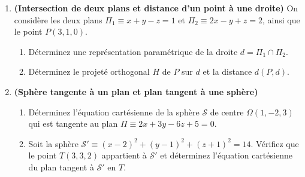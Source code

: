 \begin{enumerate}[label=\textbf{Exercice 7.\arabic* --}, align=left, leftmargin=*]
    \item \textbf{(Intersection de deux plans et distance d'un point à une droite)}
    On considère les deux plans $\Pi_1 \equiv x + y - z = 1$ et $\Pi_2 \equiv 2x - y + z = 2$, ainsi que le point $P(3, 1, 0)$.
    \begin{enumerate}[label=(\alph*)]
        \item Déterminez une représentation paramétrique de la droite $d = \Pi_1 \cap \Pi_2$.
        \item Déterminez le projeté orthogonal $H$ de $P$ sur $d$ et la distance $d(P, d)$.
    \end{enumerate}

    \item \textbf{(Sphère tangente à un plan et plan tangent à une sphère)}
    \begin{enumerate}[label=(\alph*)]
        \item Déterminez l'équation cartésienne de la sphère $\mathcal{S}$ de centre $\Omega(1, -2, 3)$ qui est tangente au plan $\Pi \equiv 2x + 3y - 6z + 5 = 0$.
        \item Soit la sphère $\mathcal{S}' \equiv (x-2)^2 + (y-1)^2 + (z+1)^2 = 14$. Vérifiez que le point $T(3, 3, 2)$ appartient à $\mathcal{S}'$ et déterminez l'équation cartésienne du plan tangent à $\mathcal{S}'$ en $T$.
    \end{enumerate}

\end{enumerate}

